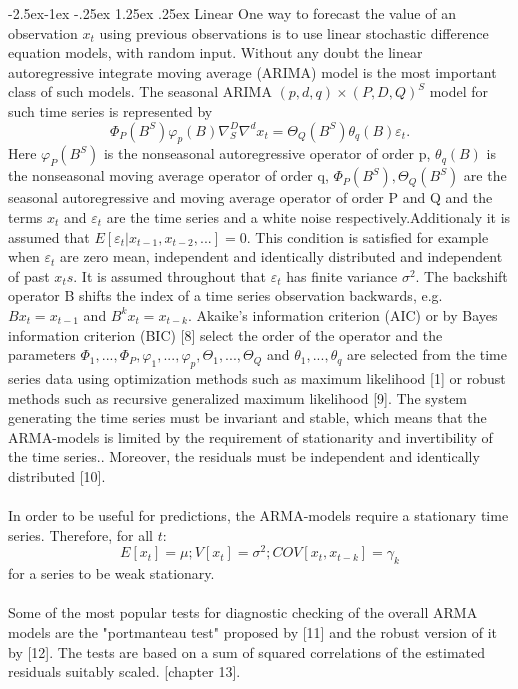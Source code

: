 \documentclass[runningheads,a4paper]{llncs}[2015/06/24]
\makeatletter
\renewcommand\paragraph{\@startsection{paragraph}{4}{\z@}%
            {-2.5ex\@plus -1ex \@minus -.25ex}%
            {1.25ex \@plus .25ex}%
            {\normalfont\normalsize\bfseries}}
\makeatother
\begin{document}
\paragraph{Linear}
One way to forecast the value of an observation $x_t$ using previous observations is to use linear stochastic difference equation models, with random input. Without any doubt the linear autoregressive integrate moving average (ARIMA) model is the most important class of such models. The seasonal ARIMA $(p, d, q) × (P, D, Q)^S$ model for such time series is represented by
\begin{equation}
Φ_P (B^S)φ_p(B)∇^D_S ∇^d x_t = Θ_Q(B^S)θ_q (B)ε_t.
\end{equation}
Here $φ_P (B^S)$ is the nonseasonal autoregressive operator of order p, $θ_q (B)$ is the nonseasonal moving average operator of order q, $Φ_P (B^S), Θ_Q(B^S)$ are the seasonal autoregressive and moving average operator of order P and Q and the terms $x_t$ and $ε_t$ are the time series and a white noise respectively.Additionaly it is assumed that $E[ε_t|x_{t−1}, x_{t−2},...] = 0$. This condition is satisfied for example when $ε_t$ are
zero mean, independent and identically distributed and independent of past $x_ts$. It is assumed throughout that $ε_t$ has finite variance $σ^2$. The backshift operator B shifts the index of a time series observation backwards,  e.g. $Bx_t = x_{t−1}$ and $B^k x_t = x_{t−k}$. Akaike’s information criterion (AIC) or by Bayes information criterion (BIC) [8] select the order of the operator and the parameters $Φ_1,...,Φ_P , φ_1,...,φ_p, Θ_1,...,Θ_Q$ and $θ_1,...,θ_q$ are selected from the time series data using optimization methods such as maximum likelihood [1] or  robust methods such as recursive generalized maximum likelihood [9]. The system generating the time series must be invariant and stable, which means that the ARMA-models is limited by the requirement of stationarity and invertibility of the time series.. Moreover, the residuals must be independent and identically distributed [10]. \\\\In order to be useful for predictions, the ARMA-models require a stationary time series. Therefore, for all $t$:
\begin{equation}
E[x_t] = μ; V[x_t] = σ^2; COV[x_t, x_{t−k} ] = γ_k 
\end{equation}
for a series to be weak stationary.
\\\\Some of the most popular tests for diagnostic checking of the overall ARMA models are the "portmanteau test" proposed by [11] and the robust version of it by [12]. The tests are based on a sum of squared correlations of the estimated residuals suitably scaled. [chapter 13]. 
\end{document}
